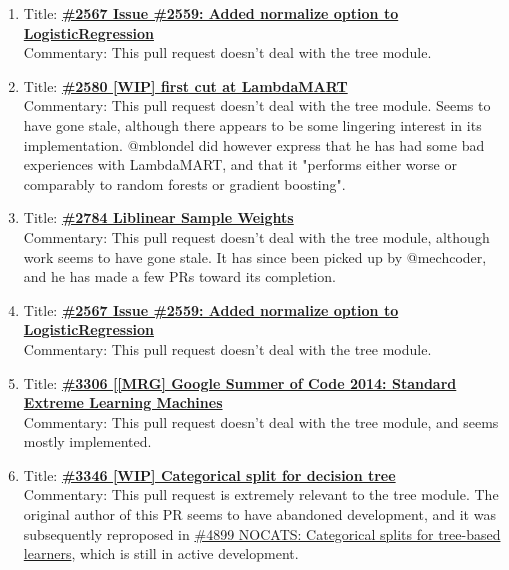 \documentclass[12pt, oneside]{article}
\begin{document}
\begin{enumerate}
  \item 
  Title:
  \textbf{\href{https://github.com/scikit-learn/scikit-learn/pull/2567}
    {\#2567 Issue \#2559: Added normalize option to LogisticRegression}}\\
  Commentary: This pull request doesn't deal with the tree module.

  \item 
  Title:
  \textbf{\href{https://github.com/scikit-learn/scikit-learn/pull/2580}
    {\#2580 [WIP] first cut at LambdaMART}}\\
  Commentary: This pull request doesn't deal with the tree
  module. Seems to have gone stale, although there appears to be some
  lingering interest in its implementation. @mblondel did however
  express that he has had some bad experiences with LambdaMART, and
  that it "performs either worse or comparably to random forests or
  gradient boosting".


  \item 
  Title:
  \textbf{\href{https://github.com/scikit-learn/scikit-learn/pull/2784}
    {\#2784 Liblinear Sample Weights}}\\
  Commentary: This pull request doesn't deal with the tree module,
  although work seems to have gone stale. It has since been picked up
  by @mechcoder, and he has made a few PRs toward its completion.


  \item 
  Title:
  \textbf{\href{https://github.com/scikit-learn/scikit-learn/pull/2567}
    {\#2567 Issue \#2559: Added normalize option to LogisticRegression}}\\
  Commentary: This pull request doesn't deal with the tree module.

  
  \item 
  Title:
  \textbf{\href{https://github.com/scikit-learn/scikit-learn/pull/3306}
    {\#3306 [[MRG] Google Summer of Code 2014: Standard Extreme Learning Machines}}\\
  Commentary: This pull request doesn't deal with the tree module, and
  seems mostly implemented.


  \item 
  Title:
  \textbf{\href{https://github.com/scikit-learn/scikit-learn/pull/3346}
    {\#3346 [WIP] Categorical split for decision tree}}\\
  Commentary: This pull request is extremely relevant to the tree
  module. The original author of this PR seems to have abandoned
  development, and it was subsequently reproposed in
  \href{https://github.com/scikit-learn/scikit-learn/pull/4899}{\#4899
    NOCATS: Categorical splits for tree-based learners}, which is
  still in active development.


\end{enumerate}
\end{document}
